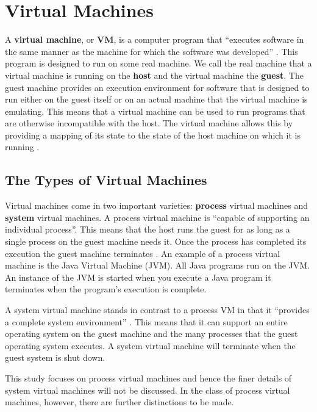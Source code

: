 \documentclass[english,a4paper,12pt]{report}
\begin{document}
\section{Virtual Machines}
\label{sec:vms}
A \textbf{virtual machine}, or \textbf{VM}, is a computer program that
``executes software in the same manner as the machine for which the
software was developed'' \cite[pg9]{JamesE.Smith2005}. This program is
designed to run on some real machine. We call the real machine that a
virtual machine is running on the \textbf{host} and the virtual
machine the \textbf{guest}. The guest machine provides an execution
environment for software that is designed to run either on the guest
itself or on an actual machine that the virtual machine is
emulating. This means that a virtual machine can be used to run
programs that are otherwise incompatible with the host. The virtual machine
allows this by providing a mapping of its state to the state of the
host machine on which it is running \cite[pg4]{JamesE.Smith2005}.

\subsection{The Types of Virtual Machines}
Virtual machines come in two important varieties: \textbf{process} virtual
machines and \textbf{system} virtual machines. A process virtual
machine is ``capable of supporting an individual
process''\cite[pg9]{JamesE.Smith2005}. This means that the host runs
the guest for as long as a single process on the guest machine needs
it. Once the process has completed its execution the guest machine
terminates \cite[pg9]{JamesE.Smith2005}. An example of a process
virtual machine is the Java Virtual Machine (JVM). All Java programs
run on the JVM. An instance of the JVM is started when you execute a
Java program it terminates when the program's execution is complete.

A system virtual machine stands in contrast to a process VM in that it
``provides a complete system environment''
\cite[pg9]{JamesE.Smith2005}. This means that it can support an entire
operating system on the guest machine and the many processes that the
guest operating system executes. A system virtual machine will
terminate when the guest system is shut down.

This study focuses on process virtual machines and hence the finer
details of system virtual machines will not be discussed. In the class
of process virtual machines, however, there are further distinctions
to be made.
\end{document}
